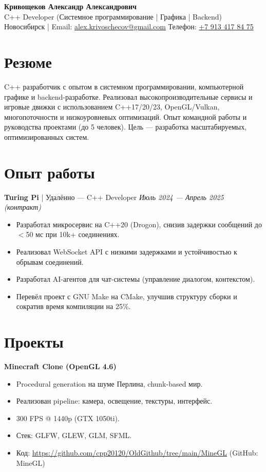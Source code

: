\documentclass[a4paper,10pt]{article}
\begin{document}
\begin{center}
    {\LARGE \textbf{Кривощеков Александр Александрович}}\\
    \small C++ Developer (Системное программирование | Графика | Backend)\\
    Новосибирск | Email: \href{mailto:alex.krivoschecov@gmail.com}{alex.krivoschecov@gmail.com}  
Телефон: \href{tel:+79134178475}{+7 913 417 84 75}  
\end{center}

\section*{Резюме}
C++ разработчик с опытом в системном программировании, компьютерной графике и backend-разработке.  
Реализовал высокопроизводительные сервисы и игровые движки с использованием C++17/20/23, OpenGL/Vulkan, многопоточности и низкоуровневых оптимизаций.  
Опыт командной работы и руководства проектами (до 5 человек).  
Цель — разработка масштабируемых, оптимизированных систем.

\section*{Опыт работы}

\textbf{Turing Pi} | Удалённо — C++ Developer  
\textit{Июль 2024 — Апрель 2025 (контракт)}  
\begin{itemize}[noitemsep]
    \item Разработал микросервис на C++20 (Drogon), снизив задержки сообщений до $<$50 мс при 10k+ соединениях.
    \item Реализовал WebSocket API с низкими задержками и устойчивостью к обрывам соединений.
    \item Разработал AI-агентов для чат-системы (управление диалогом, контекстом).
    \item Перевёл проект с GNU Make на CMake, улучшив структуру сборки и сократив время компиляции на 25\%.
\end{itemize}

\section*{Проекты}

\textbf{Minecraft Clone (OpenGL 4.6)}  
\begin{itemize}[noitemsep]  
    \item Procedural generation на шуме Перлина, chunk-based мир.  
    \item Реализован pipeline: камера, освещение, текстуры, интерфейс.  
    \item 300 FPS @ 1440p (GTX 1050ti).  
    \item Стек: GLFW, GLEW, GLM, SFML.  
    \item Код: \url{https://github.com/cpp20120/OldGithub/tree/main/MineGL}  
    (GitHub: MineGL)  
\end{itemize}  
\end{document}
